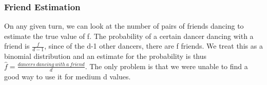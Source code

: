 \subsubsection{Friend Estimation}
On any given turn, we can look at the number of pairs of friends dancing to estimate the true value of f. The probability of a certain dancer dancing with a friend is $\frac{f}{d-1}$, since of the d-1 other dancers, there are f friends. We treat this as a binomial distribution and an estimate for the probability is thus $\hat{f} = \frac{dancers\ dancing\ with\ a\ friend}{d}$. The only problem is that we were unable to find a good way to use it for medium d values.\\